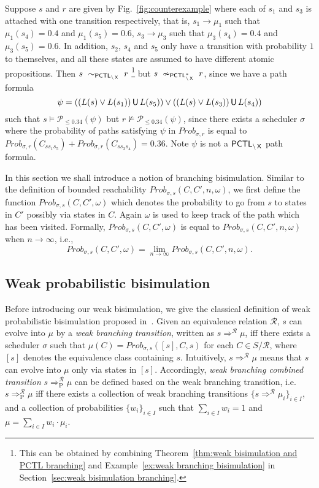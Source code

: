 \documentclass{LMCS}
\DeclareMathOperator{\U}{\text{\sf U}}
\DeclareMathOperator{\X}{\text{\sf X}}
\newcommand{\TRAN}[2]{#1\rightarrow #2}
\newcommand{\PCTL}{{\sf PCTL}}
\newcommand{\MC}[1]{\mathcal{#1}}
\newcommand{\EPCTLWN}{\sim_{\PCTL_{\backslash\X}}}
\newcommand{\nEPCTLSWN}{\nsim_{\PCTL^{*}_{\backslash\X}}}
\newcommand{\bTRAN}[2]{#1\Rightarrow^{\MC{R}}#2}
\newcommand{\bTRANP}[2]{#1\Rightarrow^{\MC{R}}_{\text{P}}#2}
\newcommand{\MEASURE}{\mathit{Prob}}
\begin{document}
\begin{exa}\label{ex:counterexample weak}
  Suppose $s$ and $r$ are given by Fig.~\ref{fig:counterexample} where
  each of $s_1$ and $s_3$ is attached with one transition
  respectively, that is, $\TRAN{s_1}{\mu_1}$ such that
  $\mu_1(s_4)=0.4$ and $\mu_1(s_5)=0.6$, $\TRAN{s_3}{\mu_3}$ such that
  $\mu_3(s_4)=0.4$ and $\mu_3(s_5)=0.6$. In addition, $s_2$, $s_4$ and
  $s_5$ only have a transition with probability $1$ to themselves, and
  all these states are assumed to have different atomic
  propositions. Then $s~\EPCTLWN~r$ \footnote{This can be obtained by
    combining Theorem~\ref{thm:weak bisimulation and PCTL branching}
    and Example~\ref{ex:weak branching bisimulation} in
    Section~\ref{sec:weak bisimulation branching}.} but
  $s~\nEPCTLSWN~r$, since we have a path formula $$\psi=((L(s)\lor
  L(s_1))\U L(s_5))\lor((L(s)\lor L(s_3))\U L(s_4))$$ such that
  $s\models\MC{P}_{\leq0.34}(\psi)$ but $r\not\models\MC{P}_{\leq
    0.34}(\psi)$, since there exists a scheduler $\sigma$ where the
  probability of paths satisfying $\psi$ in
  $\MEASURE_{\sigma,r}$ is equal to
  $\MEASURE_{\sigma,r}(C_{ss_1s_5})+\MEASURE_{\sigma,r}(C_{ss_3s_4})=0.36$.
  Note $\psi$ is not a  $\PCTL_{\backslash\X}$ path formula.
\end{exa}

In this section we shall introduce a notion of branching bisimulation. 
Similar to the definition of bounded reachability $\MEASURE_{\sigma,s}(C,C',n,\omega)$, we first define the function $\MEASURE_{\sigma,s}(C,C',\omega)$ which denotes the probability
to go from $s$ to states in $C'$ possibly via states in $C$. Again $\omega$ is used to keep track of the path which has been visited. Formally,  $\MEASURE_{\sigma,s}(C,C',\omega)$ is equal to
$\MEASURE_{\sigma,s}(C,C',n,\omega)$ when $n\rightarrow\infty$, i.e.,
\begin{equation}\label{eq:definition of transition branching unbounded}
\MEASURE_{\sigma,s}(C,C',\omega)=\lim_{n\rightarrow\infty}\MEASURE_{\sigma,s}(C,C',n,\omega).
\end{equation}

\subsection{Weak probabilistic bisimulation}\label{sec:weak branching segala}
Before introducing our weak bisimulation, we give the classical
definition of weak probabilistic bisimulation proposed
in~\cite{SegalaL95}. Given an equivalence relation $\MC{R}$, $s$ can
evolve into $\mu$ by a \emph{weak branching transition}, written as
$\bTRAN{s}{\mu}$, iff there exists a scheduler $\sigma$ such that
$\mu(C)=\MEASURE_{\sigma,s}([s],C,s)$ for each $C\in S/\MC{R}$,
where $[s]$ denotes the equivalence class containing $s$. Intuitively, $\bTRAN{s}{\mu}$ means that $s$ can evolve into $\mu$
only via states in $[s]$. Accordingly, \emph{weak branching combined
  transition} $\bTRANP{s}{\mu}$ can be defined based on the weak branching
transition, i.e. $\bTRANP{s}{\mu}$ iff there exists a collection of
weak branching transitions $\{\bTRAN{s}{\mu_i}\}_{i\in I}$, and a
collection of probabilities $\{w_i\}_{i\in I}$ such that 
$\sum_{i\in I}w_i=1$ and $\mu=\sum_{i\in I}w_i\cdotp\mu_i$.
\end{document}
